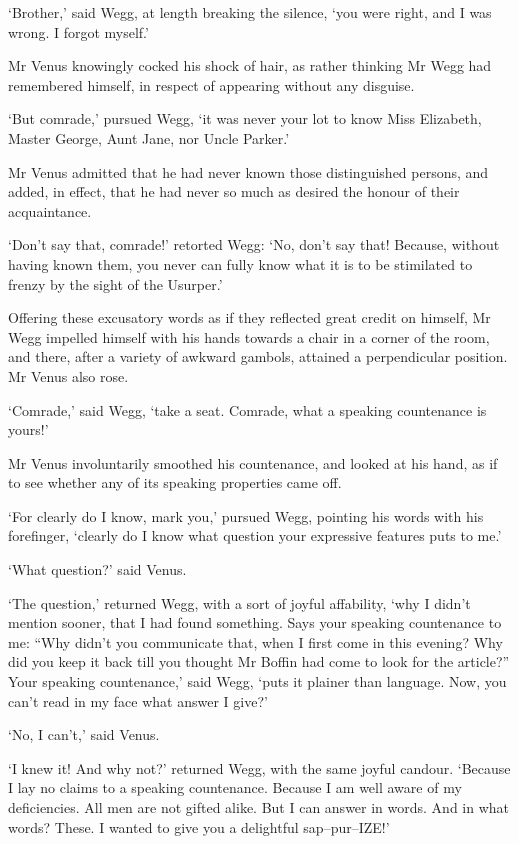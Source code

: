 ‘Brother,’ said Wegg, at length breaking the silence, ‘you were right,
and I was wrong. I forgot myself.’

Mr Venus knowingly cocked his shock of hair, as rather thinking Mr Wegg
had remembered himself, in respect of appearing without any disguise.

‘But comrade,’ pursued Wegg, ‘it was never your lot to know Miss
Elizabeth, Master George, Aunt Jane, nor Uncle Parker.’

Mr Venus admitted that he had never known those distinguished persons,
and added, in effect, that he had never so much as desired the honour of
their acquaintance.

‘Don’t say that, comrade!’ retorted Wegg: ‘No, don’t say that! Because,
without having known them, you never can fully know what it is to be
stimilated to frenzy by the sight of the Usurper.’

Offering these excusatory words as if they reflected great credit on
himself, Mr Wegg impelled himself with his hands towards a chair in
a corner of the room, and there, after a variety of awkward gambols,
attained a perpendicular position. Mr Venus also rose.

‘Comrade,’ said Wegg, ‘take a seat. Comrade, what a speaking countenance
is yours!’

Mr Venus involuntarily smoothed his countenance, and looked at his hand,
as if to see whether any of its speaking properties came off.

‘For clearly do I know, mark you,’ pursued Wegg, pointing his words
with his forefinger, ‘clearly do I know what question your expressive
features puts to me.’

‘What question?’ said Venus.

‘The question,’ returned Wegg, with a sort of joyful affability, ‘why
I didn’t mention sooner, that I had found something. Says your speaking
countenance to me: “Why didn’t you communicate that, when I first come
in this evening? Why did you keep it back till you thought Mr Boffin had
come to look for the article?” Your speaking countenance,’ said Wegg,
‘puts it plainer than language. Now, you can’t read in my face what
answer I give?’

‘No, I can’t,’ said Venus.

‘I knew it! And why not?’ returned Wegg, with the same joyful candour.
‘Because I lay no claims to a speaking countenance. Because I am well
aware of my deficiencies. All men are not gifted alike. But I can answer
in words. And in what words? These. I wanted to give you a delightful
sap--pur--IZE!’

